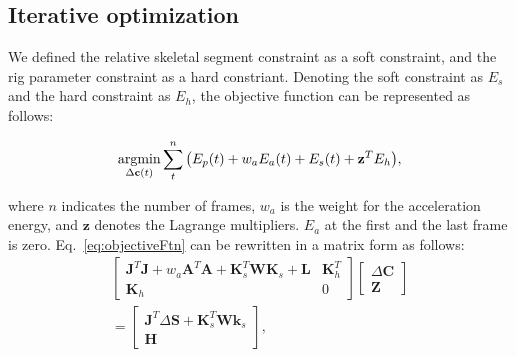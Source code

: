 %

\subsection{Iterative optimization} \label{objectiveFunction}
We defined the relative skeletal segment constraint as a soft constraint, and the rig parameter constraint as a hard constriant.
Denoting the soft constraint as $E_s$ and the hard constraint as $E_h$, the objective function can be represented as follows:

\newcommand{\argmin}{\operatornamewithlimits{argmin}}

\begin{equation}
\argmin_{\Delta{\mathbf{c}(t)}}{\sum_t^n \left( {E_p(t) + w_aE_a(t)+E_s(t)+ \mathbf{z}^T E_h}\right)},
\label{eq:objectiveFtn}
\end{equation}

where $n$ indicates the number of frames, $w_a$ is the weight for the acceleration energy, and $\mathbf{z}$ denotes the Lagrange multipliers. $E_a$ at the first and the last frame is zero. Eq.~\ref{eq:objectiveFtn} can be rewritten in a matrix form as follows:
\begin{equation}
\begin{split}
\begin{bmatrix}
\boldsymbol{J}^T\boldsymbol{J}+w_a\boldsymbol{A}^T\boldsymbol{A}+\boldsymbol{K}_s^T\boldsymbol{W}\boldsymbol{K}_s+\boldsymbol{L} & \boldsymbol{K}_h^T\\ 
\boldsymbol{K}_h & 0 
\end{bmatrix}
\begin{bmatrix}
\Delta\boldsymbol{C}\\ 
\boldsymbol{Z}
\end{bmatrix}\\
=
\begin{bmatrix}
\boldsymbol{J}^T\Delta\boldsymbol{S} + \boldsymbol{K}_s^T\boldsymbol{W}\boldsymbol{k}_s\\ 
\boldsymbol{H}
\end{bmatrix},
\end{split}
\end{equation}

